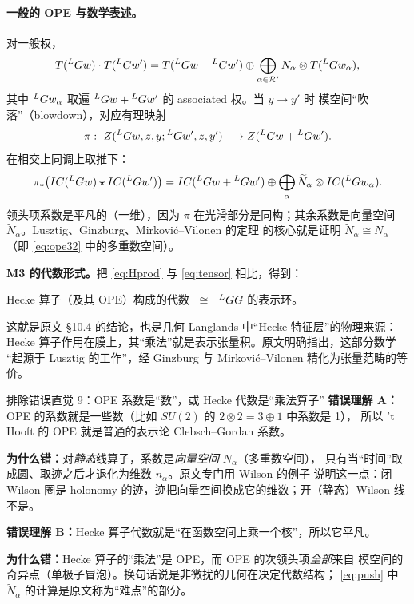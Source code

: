 \paragraph{一般的 OPE 与数学表述。}对一般权，
\begin{equation}
T({}^{L}G w)\cdot T({}^{L}G w')
=T({}^{L}G w+{}^{L}G w')\oplus\bigoplus_{\alpha\in\mathcal{R}'}
N_\alpha\otimes T({}^{L}G w_\alpha),
\label{eq:ope32}
\end{equation}
其中 ${}^{L}G w_\alpha$ 取遍 ${}^{L}G w+{}^{L}G w'$ 的 associated 权。当 $y\to y'$ 时
模空间“吹落”（blowdown），对应有理映射
\begin{equation}
\pi:\ Z({}^{L}G w,z,y;{}^{L}G w',z,y')\longrightarrow Z({}^{L}G w+{}^{L}G w').
\label{eq:blowdown}
\end{equation}
在相交上同调上取推下：
\begin{equation}
\pi_*\bigl(IC({}^{L}G w)\star IC({}^{L}G w')\bigr)
=IC({}^{L}G w+{}^{L}G w')\oplus\bigoplus_\alpha \widetilde N_\alpha\otimes IC({}^{L}G w_\alpha).
\label{eq:push}
\end{equation}
领头项系数是平凡的（一维），因为 $\pi$ 在光滑部分是同构；其余系数是向量空间
$\widetilde N_\alpha$。Lusztig、Ginzburg、Mirković--Vilonen 的定理
\pA{}的核心就是证明 $\widetilde N_\alpha\cong N_\alpha$
（即 \eqref{eq:ope32} 中的多重数空间）。\pA{}

\begin{keyidea}
\textbf{M3 的代数形式。}把 \eqref{eq:Hprod} 与 \eqref{eq:tensor} 相比，得到：
\begin{center}
Hecke 算子（及其 OPE）构成的代数 $\;\cong\;$ ${}^{L}G G$ 的表示环。
\end{center}
这就是原文 §10.4 的结论，也是几何 Langlands 中“Hecke 特征层”的物理来源：
Hecke 算子作用在膜上，其“乘法”就是表示张量积。原文明确指出，这部分数学
“起源于 Lusztig 的工作”，经 Ginzburg 与 Mirković--Vilonen 精化为张量范畴的等价。
\pA{}
\end{keyidea}

\begin{kcard}{排除错误直觉 9：OPE 系数是“数”，或 Hecke 代数是“乘法算子”}
\textbf{错误理解 A：}OPE 的系数就是一些数（比如 $SU(2)$ 的 $2\otimes2=3\oplus1$ 中系数是 1），
所以 't Hooft{} 的 OPE 就是普通的表示论 Clebsch--Gordan 系数。

\textbf{为什么错：}对\emph{静态}线算子，系数是\emph{向量空间} $N_\alpha$（多重数空间），
只有当“时间”取成圆、取迹之后才退化为维数 $n_\alpha$。原文专门用 Wilson 的例子
说明这一点：闭 Wilson 圈是 holonomy 的迹，迹把向量空间换成它的维数；开（静态）Wilson 线
不是。\pA{}

\textbf{错误理解 B：}Hecke 算子代数就是“在函数空间上乘一个核”，所以它平凡。

\textbf{为什么错：}Hecke 算子的“乘法”是 OPE，而 OPE 的次领头项\emph{全部}来自
模空间的奇异点（单极子冒泡）。换句话说是非微扰的几何在决定代数结构；
\eqref{eq:push} 中 $\widetilde N_\alpha$ 的计算是原文称为“难点”的部分。
\end{kcard}

